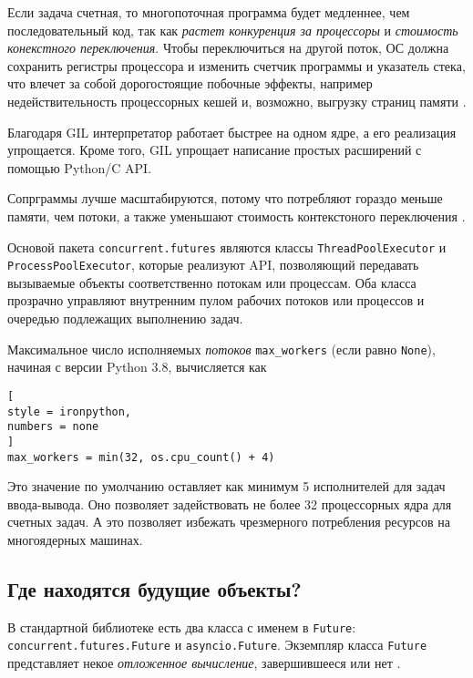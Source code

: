 \documentclass[%
	11pt,
	a4paper,
	utf8,
		]{article}
\begin{document}
Если задача счетная, то многопоточная программа будет медленнее, чем последовательный код, так как \emph{растет конкуренция за процессоры} и \emph{стоимость конекстного переключения}. Чтобы переключиться на другой поток, ОС должна сохранить регистры процессора и изменить счетчик программы и указатель стека, что влечет за собой дорогостоящие побочные эффекты, например недействительность процессорных кешей и, возможно, выгрузку страниц памяти \cite[]{ramalho:python-2022}.

Благодаря GIL интерпретатор работает быстрее на одном ядре, а его реализация упрощается. Кроме того, GIL упрощает написание простых расширений с помощью Python/C API.

Сопрграммы лучше масштабируются, потому что потребляют гораздо меньше памяти, чем потоки, а также уменьшают стоимость контекстоного переключения \cite[]{ramalho:python-2022}.

Основой пакета \verb|concurrent.futures| являются классы \verb*|ThreadPoolExecutor| и \verb|ProcessPoolExecutor|, которые реализуют API, позволяющий передавать вызываемые объекты соответственно потокам или процессам. Оба класса прозрачно управляют внутренним пулом рабочих потоков или процессов и очередью подлежащих выполнению задач.

Максимальное число исполняемых \emph{потоков} \verb*|max_workers| (если равно \verb|None|), начиная с версии Python 3.8, вычисляется как \cite[]{ramalho:python-2022}
\begin{lstlisting}[
style = ironpython,
numbers = none
]
max_workers = min(32, os.cpu_count() + 4)
\end{lstlisting}

Это значение по умолчанию оставляет как минимум 5 исполнителей для задач ввода-вывода. Оно позволяет задействовать не более 32 процессорных ядра для счетных задач. А это позволяет избежать чрезмерного потребления ресурсов на многоядерных машинах.

\subsection{Где находятся будущие объекты?}

В стандартной библиотеке есть два класса с именем в \verb*|Future|: \verb|concurrent.futures.Future| и \verb*|asyncio.Future|. Экземпляр класса \verb|Future| представляет некое \emph{отложенное вычисление}, завершившееся или нет \cite[]{ramalho:python-2022}.
\end{document}
